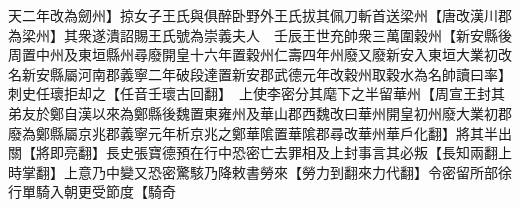 天二年改為劒州】掠女子王氏與俱醉卧野外王氏拔其佩刀斬首送梁州【唐改漢川郡為梁州】其衆遂潰詔賜王氏號為崇義夫人　壬辰王世充帥衆三萬圍穀州【新安縣後周置中州及東垣縣州尋廢開皇十六年置穀州仁壽四年州廢又廢新安入東垣大業初改名新安縣屬河南郡義寧二年破段達置新安郡武德元年改穀州取穀水為名帥讀曰率】刺史任瓌拒却之【任音壬瓌古回翻】　上使李密分其麾下之半留華州【周宣王封其弟友於鄭自漢以來為鄭縣後魏置東雍州及華山郡西魏改曰華州開皇初州廢大業初郡廢為鄭縣屬京兆郡義寧元年析京兆之鄭華隂置華隂郡尋改華州華戶化翻】將其半出關【將即亮翻】長史張寶德預在行中恐密亡去罪相及上封事言其必叛【長知兩翻上時掌翻】上意乃中變又恐密驚駭乃降敕書勞來【勞力到翻來力代翻】令密留所部徐行單騎入朝更受節度【騎奇